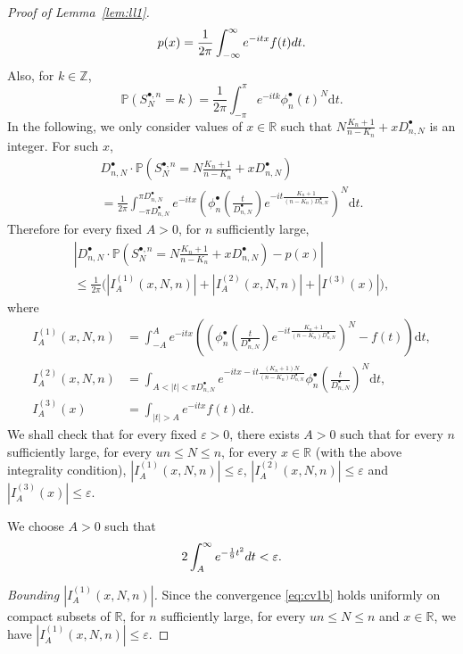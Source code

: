 \documentclass[11pt]{article}
\theoremstyle{definition}
\numberwithin{equation}{section}
\numberwithin{figure}{section}
\numberwithin{table}{section}
\newcommand{\R}{\mathbb{R}}
\def\d{{\rm d}}
\def\Sbn{S^{\bullet,n}}
\def\phibn{\phi^{\bullet}_{n}}
\def\DbnN{D^{\bullet}_{n,N}}
\renewcommand{\epsilon}{\varepsilon}
\renewcommand\Pr[1]{\mathbb{P}\left(#1\right)}
\begin{document}
\begin{proof}[Proof of Lemma~\ref{lem:ll1}]
\begin{equation}
 \label{eq:fourierb}  p(x)= \frac{1}{2\pi} \int_{-\infty}^{\infty} e^{-itx} f(t) {\d}t.
 \end{equation}
Also, for $k \in \mathbb{Z}$,
\[ \Pr{\Sbn_{N}=k} = \frac{1}{2\pi} \int_{-\pi}^{\pi} e^{-itk} \phibn(t)^{ N} {\mathrm{d}}t.\]
In the following, we only consider values of $x \in \R$ such that $N \frac{K_{n}+1}{n-K_{n}}+x  \DbnN$ is an integer.
For such $x$,
\begin{multline*}
  \DbnN \cdot \Pr{\Sbn_{ N}= N \frac{K_{n}+1}{n-K_{n}}+x  \DbnN}\\
  =  \frac{1}{2\pi} \int^{\pi \DbnN}_{-\pi \DbnN} e^{- i t x} \left(  \phibn \left(  \frac{t}{\DbnN} \right)   e^{-it \frac{K_{n}+1}{(n-K_{n}) \DbnN}} \right)^{N} {\mathrm{d}}t.
\end{multline*}
Therefore for every fixed $A>0$, for $n$ sufficiently large,
\begin{multline*}
  \left| \DbnN \cdot \Pr{\Sbn_{N}= N \frac{K_{n}+1}{n-K_{n}}+x  \DbnN} -p( x)\right| \\
  \leq \frac{1}{2 \pi} \big(|I^{(1)}_{A}(x,N,n)| + |I^{(2)}_{A}(x,N,n)|+|I^{(3)}(x)|\big),
\end{multline*}
where
\begin{align*}
  I^{(1)}_{A}(x,N,n)&=\int_{-A}^{A} e^{-i t x} \left(   \left(  \phibn \left(  \frac{t}{\DbnN} \right)   e^{-it \frac{K_{n}+1}{(n-K_{n}) \DbnN}} \right)^{N}- f(t) \right) {\mathrm{d}}t,\\
 I^{(2)}_{A}(x,N,n)&= \int_{A<|t|< \pi \DbnN} e^{-itx - it \frac{(K_{n}+1) N}{(n-K_{n}) \DbnN}} \phibn \left(  \frac{t}{\DbnN} \right) ^{ N}{\mathrm{d}}t, \\
 I^{(3)}_{A}(x)&= \int_{|t|>A} e^{-itx} f(t) {\mathrm{d}}t.
 \end{align*}
We shall check that for every fixed $\epsilon>0$, there exists $A>0$ such that for every $n$ sufficiently large, for every $ un \leq N \leq  n$, for every $x \in \R$ (with the above integrality condition),  $|I^{(1)}_{A}(x,N,n)| \leq \epsilon$, $|I^{(2)}_{A}(x,N,n)| \leq \epsilon$ and $|I^{(3)}_{A}(x)| \leq\epsilon$.



 We choose $A >0$ such that
\begin{equation}
\label{eq:Ab} 2 \int_{A}^{\infty } e^{-  \frac{1}{9} t^{2}} {\d}t < \epsilon.
\end{equation}


\emph{Bounding $|I^{(1)}_{A}(x,N,n)|$.} Since the convergence \eqref{eq:cv1b} holds  uniformly on compact subsets of $\R$, for   $n$ sufficiently large, for every $ un \leq N \leq n$ and $x \in \R$, we have $|I^{(1)}_{A}(x,N,n)| \leq \epsilon$.


\end{proof}
\end{document}
